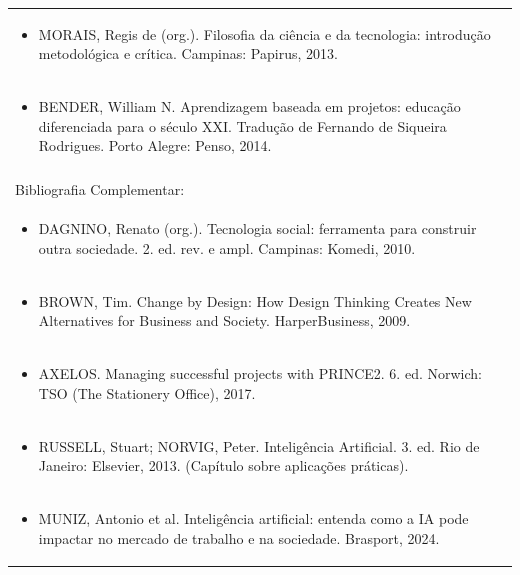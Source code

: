 \documentclass[11pt]{article}
\begin{document}
\begin{center}
\begin{longtable}{|p{4cm}|p{4cm}|p{4cm}|p{4cm}|}
\multicolumn{4}{|p{\dimexpr 16cm + 6\tabcolsep\relax}|}{\begin{itemize}\item MORAIS, Regis de (org.). Filosofia da ciência e da tecnologia: introdução metodológica e crítica. Campinas: Papirus, 2013.\end{itemize}}\\
\multicolumn{4}{|p{\dimexpr 16cm + 6\tabcolsep\relax}|}{\begin{itemize}\item BENDER, William N. Aprendizagem baseada em projetos: educação diferenciada para o século XXI. Tradução de Fernando de Siqueira Rodrigues. Porto Alegre: Penso, 2014.\end{itemize}}\\
\multicolumn{4}{|p{16cm}|}{}\\
\hline
\multicolumn{4}{|p{16cm}|}{Bibliografia Complementar:}\\*
\multicolumn{4}{|p{\dimexpr 16cm + 6\tabcolsep\relax}|}{\begin{itemize}\item DAGNINO, Renato (org.). Tecnologia social: ferramenta para construir outra sociedade. 2. ed. rev. e ampl. Campinas: Komedi, 2010.\end{itemize}}\\
\multicolumn{4}{|p{\dimexpr 16cm + 6\tabcolsep\relax}|}{\begin{itemize}\item BROWN, Tim. Change by Design: How Design Thinking Creates New Alternatives for Business and Society. HarperBusiness, 2009.\end{itemize}}\\
\multicolumn{4}{|p{\dimexpr 16cm + 6\tabcolsep\relax}|}{\begin{itemize}\item AXELOS. Managing successful projects with PRINCE2. 6. ed. Norwich: TSO (The Stationery Office), 2017.\end{itemize}}\\
\multicolumn{4}{|p{\dimexpr 16cm + 6\tabcolsep\relax}|}{\begin{itemize}\item RUSSELL, Stuart; NORVIG, Peter. Inteligência Artificial. 3. ed. Rio de Janeiro: Elsevier, 2013. (Capítulo sobre aplicações práticas).\end{itemize}}\\
\multicolumn{4}{|p{\dimexpr 16cm + 6\tabcolsep\relax}|}{\begin{itemize}\item MUNIZ, Antonio et al. Inteligência artificial: entenda como a IA pode impactar no mercado de trabalho e na sociedade. Brasport, 2024.\end{itemize}}\\
\hline
\end{longtable}
\end{center}
\end{document}
